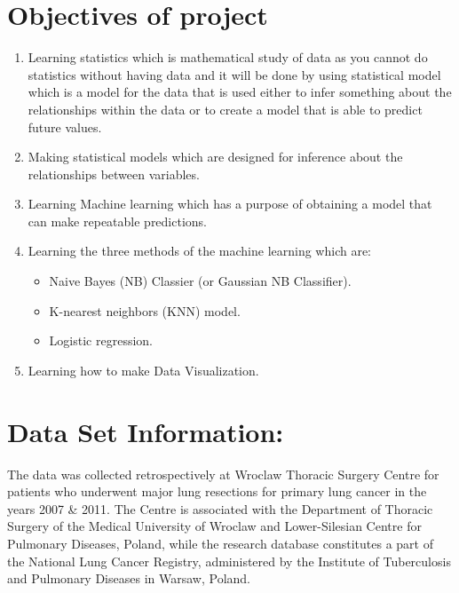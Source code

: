\documentclass[a4paper, 11pt, oneside]{article} %
\begin{document}
\section{Objectives of project }
\begin{enumerate}

\item Learning statistics which is mathematical study of data as you cannot do statistics without having data and it will be done by using statistical model which is a model for the data that is used either to infer something about the relationships within the data or to create a model that is able to predict future values. \cite{towardsdatascience1} 
\item Making statistical models which are designed for inference about the relationships between variables.
\item Learning Machine learning which has a purpose of obtaining a model that can make repeatable predictions. 
\item Learning the three methods of the machine learning which are:
\begin{itemize}
\item Naive Bayes (NB) Classier (or Gaussian NB Classifier).
\item K-nearest neighbors (KNN) model.
\item Logistic regression.
\end{itemize}
\item Learning how to make Data Visualization.

\end{enumerate}
\section{Data Set Information:} 

The data was collected retrospectively at Wroclaw Thoracic Surgery Centre for patients who underwent major lung resections for primary lung cancer in the years 2007 \& 2011. The Centre is associated with the Department of Thoracic Surgery of the Medical University of Wroclaw and Lower-Silesian Centre for Pulmonary Diseases, Poland, while the research database constitutes a part of the National Lung Cancer Registry, administered by the Institute of Tuberculosis and Pulmonary Diseases in Warsaw, Poland.\cite{archive} 
\end{document}
